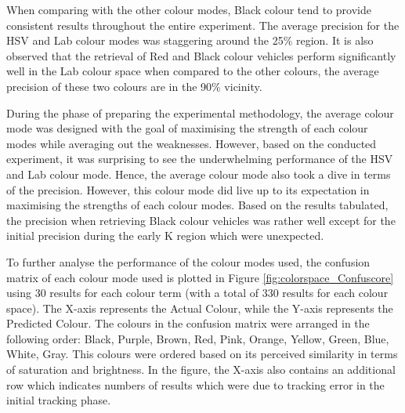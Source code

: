 When comparing with the other colour modes, Black colour tend to provide consistent results throughout the entire experiment. The average precision for the HSV and Lab colour modes was staggering around the 25\% region. It is also observed that the retrieval of Red and Black colour vehicles perform significantly well in the Lab colour space when compared to the other colours, the average precision of these two colours are in the 90\% vicinity.

During the phase of preparing the experimental methodology, the average colour mode was designed with the goal of maximising the strength of each colour modes while averaging out the weaknesses. However, based on the conducted experiment, it was surprising to see the underwhelming performance of the HSV and Lab colour mode. Hence, the average colour mode also took a dive in terms of the precision. However, this colour mode did live up to its expectation in maximising the strengths of each colour modes. Based on the results tabulated, the precision when retrieving Black colour vehicles was rather well except for the initial precision during the early K region which were unexpected.

To further analyse the performance of the colour modes used, the confusion matrix of each colour mode used is plotted in Figure \ref{fig:colorspace_Confuscore} using 30 results for each colour term (with a total of 330 results for each colour space). The X-axis represents the Actual Colour, while the Y-axis represents the Predicted Colour. The colours in the confusion matrix were arranged in the following order: Black, Purple, Brown, Red, Pink, Orange, Yellow, Green, Blue, White, Gray. This colours were ordered based on its perceived similarity in terms of saturation and brightness. In the figure, the X-axis also contains an additional row which indicates numbers of results which were due to tracking error in the initial tracking  phase.

